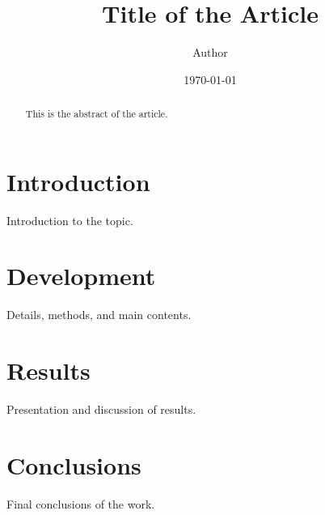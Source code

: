 \documentclass[12pt]{article}
\title{Title of the Article}
\author{Author}
\date{\today}
\begin{document}
\maketitle

\begin{abstract}
This is the abstract of the article.
\end{abstract}

\section{Introduction}
Introduction to the topic.

\section{Development}
Details, methods, and main contents.

\section{Results}
Presentation and discussion of results.

\section{Conclusions}
Final conclusions of the work.



\end{document}
